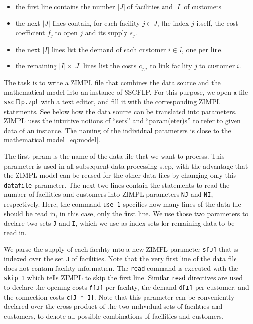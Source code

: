 \documentclass[a4paper,10pt]{article}
\begin{document}
\begin{itemize}
  \item the first line contains the number $|J|$ of facilities and $|I|$ of customers
  \item the next $|J|$ lines contain, for each facility $j \in J$, the index $j$ itself, the cost coefficient $f_{j}$ to open $j$ and its supply $s_{j}$.
  \item the next $|I|$ lines list the demand of each customer $i \in I$, one per line.
  \item the remaining $|I| \times |J|$ lines list the costs $c_{j,i}$ to link facility $j$ to customer $i$.
\end{itemize}

The task is to write a ZIMPL file that combines the data source and the mathematical model into an instance of SSCFLP.
%
For this purpose, we open a file \texttt{sscflp.zpl} with a text editor, and fill it with the corresponding ZIMPL statements.
%
See below how the data source can be translated into parameters.
%
ZIMPL uses the intuitive notions of ``sets'' and ``param(eter)s''
to refer to given data of an instance.
%
The naming of the individual parameters is close to the mathematical model~\eqref{eq:model}.


  

The first param is the name of the data file that we want to process.
%
This parameter is used in all subsequent data processing step, with the advantage that the ZIMPL model can be reused for the other data files by changing only this \texttt{datafile} parameter.
%
The next two lines contain the statements to read the number of facilities and customers into ZIMPL parameters \texttt{NJ} and \texttt{NI}, respectively.
%
Here, the command \texttt{use 1} specifies how many lines of the data file should be read in, in this case, only the first line.
%
We use those two parameters to declare two sets \texttt{J} and \texttt{I}, which we use as index sets for remaining data to be read in.

\resizebox{\textwidth}{!}{
  
}

We parse the supply of each facility into a new ZIMPL parameter \texttt{s[J]} that is indexed over the set \texttt{J} of facilities.
%
Note that the very first line of the data file does not contain facility information.
%
The \texttt{read} command is executed with the \texttt{skip 1} which tells ZIMPL to skip the first line.
%
Similar \texttt{read} directives are used to declare the opening costs \texttt{f[J]} per facility, the demand \texttt{d[I]} per customer, and the connection costs \texttt{c[J * I]}.
%
Note that this parameter can be conveniently declared over the cross-product of the two individual sets of facilities and customers,
to denote all possible combinations of facilities and customers.
%
\end{document}
